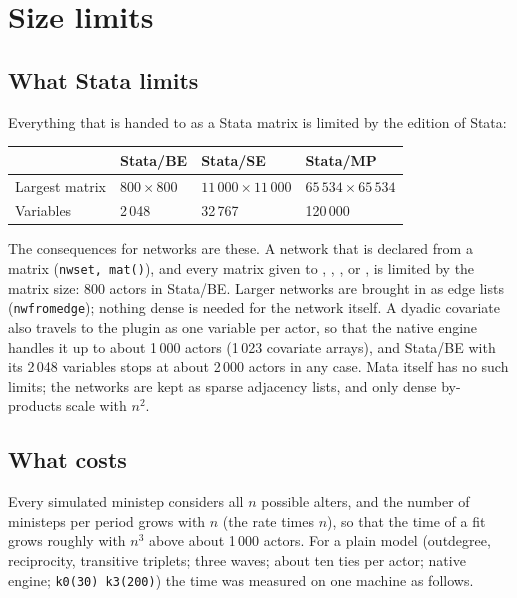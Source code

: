\section{Size limits}\label{sec:limits}

\subsection{What Stata limits}

Everything that is handed to \nwsaom{} as a Stata matrix is limited by the edition of Stata:

\begin{center}
\small
\begin{tabular}{@{}llll@{}}
\toprule
 & Stata/BE & Stata/SE & Stata/MP \\
\midrule
Largest matrix & $800\times 800$ & $11\,000\times 11\,000$ & $65\,534\times 65\,534$ \\
Variables & 2\,048 & 32\,767 & 120\,000 \\
\bottomrule
\end{tabular}
\end{center}
 The consequences for networks are these. A network that is declared from a matrix (\texttt{nwset, mat()}), and every matrix given to , , ,  or , is limited by the matrix size: 800 actors in Stata/BE. Larger networks are brought in as edge lists (\texttt{nwfromedge}); nothing dense is needed for the network itself. A dyadic covariate also travels to the plugin as one variable per actor, so that the native engine handles it up to about 1\,000 actors (1\,023 covariate arrays), and Stata/BE with its 2\,048 variables stops at about 2\,000 actors in any case. Mata itself has no such limits; the networks are kept as sparse adjacency lists, and only dense by-products scale with $n^2$.

\subsection{What \nwsaom{} costs}

Every simulated ministep considers all $n$ possible alters, and the number of ministeps per period grows with $n$ (the rate times $n$), so that the time of a fit grows roughly with $n^3$ above about 1\,000 actors. For a plain model (outdegree, reciprocity, transitive triplets; three waves; about ten ties per actor; native engine; \texttt{k0(30) k3(200)}) the time was measured on one machine as follows.

